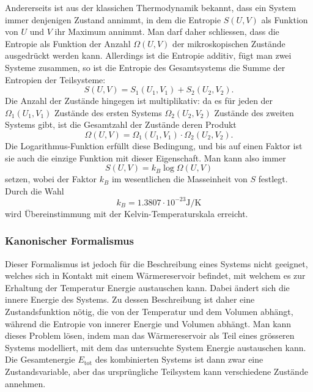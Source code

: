 Andererseits ist aus der klassichen Thermodynamik bekannt, dass ein
System immer denjenigen Zustand annimmt, in dem die Entropie $S(U,V)$
als Funktion von $U$ und $V$ ihr Maximum annimmt.
Man darf daher schliessen, dass die Entropie als Funktion der Anzahl
$\Omega(U,V)$ der mikroskopischen Zustände ausgedrückt werden kann.
Allerdings ist die Entropie additiv, fügt man zwei Systeme zusammen,
so ist die Entropie des Gesamtsystems die Summe der Entropien der
Teilsysteme:
\[
S(U,V) = S_1(U_1,V_1) + S_2(U_2,V_2).
\]
Die Anzahl der Zustände hingegen ist multiplikativ: da es für jeden
der $\Omega_1(U_1,V_1)$ Zustände des ersten Systems $\Omega_2(U_2,V_2)$
Zustände des zweiten Systems gibt, ist die Gesamtzahl der Zustände
deren Produkt
\[
\Omega(U,V)=\Omega_1(U_1,V_1)\cdot \Omega_2(U_2,V_2).
\]
Die Logarithmus-Funktion erfüllt diese Bedingung, und bis auf einen
Faktor ist sie auch die einzige Funktion mit dieser Eigenschaft.
Man kann also immer
\begin{equation}
S(U,V)=k_B\log \Omega(U,V)
\label{skript:cmb:boltzmann}
\end{equation}
setzen, wobei der Faktor $k_B$ im wesentlichen die Masseinheit von
$S$ festlegt.
Durch die Wahl
\[
k_B = 1.3807\cdot 10^{-23} \text{J}/\text{K}
\]
wird Übereinstimmung mit der Kelvin-Temperaturskala erreicht.
%

\subsubsection{Kanonischer Formalismus}
%
Dieser Formalismus ist jedoch für die Beschreibung eines Systems 
nicht geeignet, welches sich in Kontakt mit einem Wärmereservoir
befindet, mit welchem es zur Erhaltung der Temperatur Energie
austauschen kann.
Dabei ändert sich die innere Energie des Systems.
Zu dessen Beschreibung ist daher eine Zustandsfunktion nötig, die von
der Temperatur und dem Volumen abhängt, während die Entropie
von innerer Energie und Volumen abhängt.
Man kann dieses Problem lösen, indem man das Wärmereservoir als
Teil eines grösseren Systems modelliert, mit dem das untersuchte
System Energie austauschen kann.
Die Gesamtenergie $E_\text{tot}$ des kombinierten Systems ist dann zwar eine
Zustandsvariable, aber das ursprüngliche Teilsystem kann verschiedene
Zustände annehmen.

